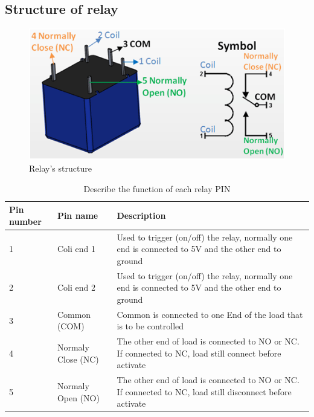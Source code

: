\documentclass[a4paper]{report}
\begin{document}
    \subsection{Structure of relay}
        \begin{figure}[ht]
            \centering
            \includegraphics[width=\linewidth]{relay.png}
            \caption{\label{fig:boat}Relay's structure}
        \end{figure}
        \begin{table}[ht]
            \centering
            \begin{tabular}{ | p{2cm} | l | p{5cm} | }
                \hline
                Pin number & Pin name & Description \\ \hline
                1 & Coli end 1 & Used to trigger (on/off) the relay, normally one end is connected to 5V and the other end to ground \\ \hline
                2 & Coli end 2 & Used to trigger (on/off) the relay, normally one end is connected to 5V and the other end to ground \\ \hline
                3 & Common (COM) & Common is connected to one End of the load that is to be controlled \\ \hline
                4 & Normaly Close (NC) & The other end of load is connected to NO or NC. If connected to NC, load still connect before activate \\ \hline
                5 & Normaly Open (NO) & The other end of load is connected to NO or NC. If connected to NC, load still disconnect before activate \\
                \hline
            \end{tabular}
            \caption{\label{tab:sixth}Describe the function of each relay PIN}
        \end{table}
        \vspace{5mm}
\end{document}
